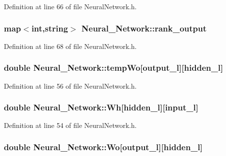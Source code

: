 Definition at line 66 of file Neural\-Network.\-h.

\hypertarget{a00003_a8e34531b701290d16068e3685f3066a4}{
\subsubsection[{rank\-\_\-output}]{\setlength{\rightskip}{0pt plus 5cm}map$<$int,string$>$ Neural\-\_\-\-Network\-::rank\-\_\-output\hspace{0.3cm}{\ttfamily [private]}}}\label{d1/d7c/a00003_a8e34531b701290d16068e3685f3066a4}


Definition at line 68 of file Neural\-Network.\-h.

\hypertarget{a00003_a1cca3513af05c6dce603fdf332b36691}{
\subsubsection[{temp\-Wo}]{\setlength{\rightskip}{0pt plus 5cm}double Neural\-\_\-\-Network\-::temp\-Wo\mbox{[}{\bf output\-\_\-l}\mbox{]}\mbox{[}{\bf hidden\-\_\-l}\mbox{]}\hspace{0.3cm}{\ttfamily [private]}}}\label{d1/d7c/a00003_a1cca3513af05c6dce603fdf332b36691}


Definition at line 56 of file Neural\-Network.\-h.

\hypertarget{a00003_a45dfc138d645e05eaeaa6ca6bb3df818}{
\subsubsection[{Wh}]{\setlength{\rightskip}{0pt plus 5cm}double Neural\-\_\-\-Network\-::\-Wh\mbox{[}{\bf hidden\-\_\-l}\mbox{]}\mbox{[}{\bf input\-\_\-l}\mbox{]}\hspace{0.3cm}{\ttfamily [private]}}}\label{d1/d7c/a00003_a45dfc138d645e05eaeaa6ca6bb3df818}


Definition at line 54 of file Neural\-Network.\-h.

\hypertarget{a00003_ad6730ce7c9fc3937299dd32473b12d1d}{
\subsubsection[{Wo}]{\setlength{\rightskip}{0pt plus 5cm}double Neural\-\_\-\-Network\-::\-Wo\mbox{[}{\bf output\-\_\-l}\mbox{]}\mbox{[}{\bf hidden\-\_\-l}\mbox{]}\hspace{0.3cm}{\ttfamily [private]}}}\label{d1/d7c/a00003_ad6730ce7c9fc3937299dd32473b12d1d}



